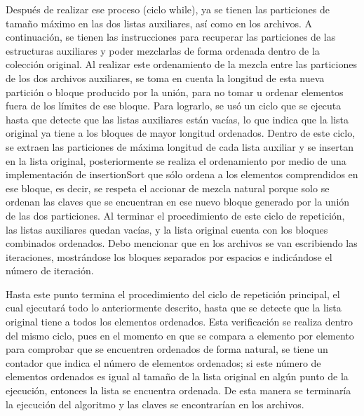 \documentclass[11pt]{article}
\begin{document}
Después de realizar ese proceso (ciclo while), ya se tienen las particiones de tamaño máximo en las dos listas auxiliares, así como en los archivos. A continuación, se tienen las instrucciones para recuperar las particiones de las estructuras auxiliares y poder mezclarlas de forma ordenada dentro de la colección original. Al realizar este ordenamiento de la mezcla entre las particiones de los dos archivos auxiliares, se toma en cuenta la longitud de esta nueva partición o bloque producido por la unión, para no tomar u ordenar elementos fuera de los límites de ese bloque. Para lograrlo, se usó un ciclo que se ejecuta hasta que detecte que las listas auxiliares están vacías, lo que indica que la lista original ya tiene a los bloques de mayor longitud ordenados. Dentro de este ciclo, se extraen las particiones de máxima longitud de cada lista auxiliar y se insertan en la lista original, posteriormente se realiza el ordenamiento por medio de una implementación de insertionSort que sólo ordena a los elementos comprendidos en ese bloque, es decir, se respeta el accionar de mezcla natural porque solo se ordenan las claves que se encuentran en ese nuevo bloque generado por la unión de las dos particiones. Al terminar el procedimiento de este ciclo de repetición, las listas auxiliares quedan vacías, y la lista original cuenta con los bloques combinados ordenados. Debo mencionar que en los archivos se van escribiendo las iteraciones, mostrándose los bloques separados por espacios e indicándose el número de iteración. 
\par
Hasta este punto termina el procedimiento del ciclo de repetición principal, el cual ejecutará todo lo anteriormente descrito, hasta que se detecte que la lista original tiene a todos los elementos ordenados. Esta verificación se realiza dentro del mismo ciclo, pues en el momento en que se compara a elemento por elemento para comprobar que se encuentren ordenados de forma natural, se tiene un contador que indica el número de elementos ordenados; si este número de elementos ordenados es igual al tamaño de la lista original en algún punto de la ejecución, entonces la lista se encuentra ordenada. De esta manera se terminaría la ejecución del algoritmo y las claves se encontrarían en los archivos.
\par
\end{document}
